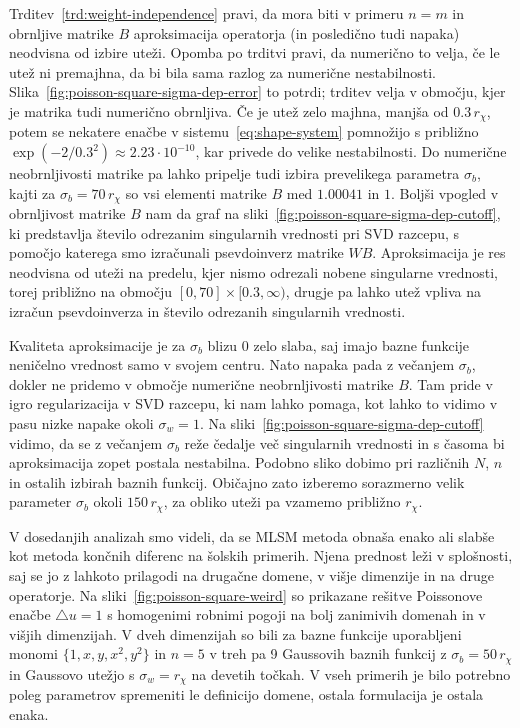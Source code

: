 \documentclass[12pt,a4paper,twoside]{article}
\theoremstyle{definition} %
\theoremstyle{plain} %
\numberwithin{equation}{section}
\newcommand{\lap}{\triangle}
\begin{document}
Trditev~\ref{trd:weight-independence} pravi, da mora biti v primeru $n=m$ in obrnljive matrike $B$
aproksimacija operatorja (in posledično tudi napaka) neodvisna od izbire uteži. Opomba po trditvi
pravi, da numerično to velja, če le utež ni premajhna, da bi bila sama razlog za numerične
nestabilnosti.  Slika~\ref{fig:poisson-square-sigma-dep-error} to potrdi; trditev velja v območju,
kjer je matrika tudi numerično obrnljiva. Če je utež zelo majhna, manjša od $0.3\,r_\chi$, potem se
nekatere enačbe v sistemu~\eqref{eq:shape-system} pomnožijo s približno $\exp(-2/0.3^2) \approx
2.23\cdot10^{-10}$, kar privede do velike nestabilnosti. Do numerične neobrnljivosti matrike pa
lahko pripelje tudi izbira prevelikega parametra $\sigma_b$, kajti za $\sigma_b = 70\,r_\chi$ so vsi
elementi matrike $B$ med $1.00041$ in $1$. Boljši vpogled v obrnljivost matrike $B$ nam da graf na
sliki~\ref{fig:poisson-square-sigma-dep-cutoff}, ki predstavlja število odrezanim singularnih
vrednosti pri SVD razcepu, s pomočjo katerega smo izračunali psevdoinverz matrike $WB$.
Aproksimacija je res neodvisna od uteži na predelu, kjer nismo odrezali nobene singularne vrednosti,
torej približno na območju $[0, 70] \times [0.3, \infty)$, drugje pa lahko utež vpliva na izračun
psevdoinverza in število odrezanih singularnih vrednosti.

Kvaliteta aproksimacije je za $\sigma_b$ blizu 0 zelo slaba, saj imajo bazne funkcije neničelno
vrednost samo v svojem centru. Nato napaka pada z večanjem $\sigma_b$, dokler ne pridemo v območje
numerične neobrnljivosti matrike $B$.  Tam pride v igro regularizacija v SVD razcepu, ki nam lahko
pomaga, kot lahko to vidimo v pasu nizke napake okoli $\sigma_w = 1$. Na
sliki~\ref{fig:poisson-square-sigma-dep-cutoff} vidimo, da se z večanjem $\sigma_b$ reže čedalje več
singularnih vrednosti in s časoma bi aproksimacija zopet postala nestabilna. Podobno sliko dobimo
pri različnih $N$, $n$ in ostalih izbirah baznih funkcij. Običajno zato izberemo sorazmerno velik
parameter $\sigma_b$ okoli $150\,r_\chi$, za obliko uteži pa vzamemo približno $r_\chi$.

V dosedanjih analizah smo videli, da se MLSM metoda obnaša enako ali slabše kot metoda končnih
diferenc na šolskih primerih. Njena prednost leži v splošnosti, saj se jo z lahkoto prilagodi na
drugačne domene, v višje dimenzije in na druge operatorje. Na sliki~\ref{fig:poisson-square-weird}
so prikazane rešitve Poissonove enačbe $\lap u = 1$ s homogenimi robnimi pogoji na bolj zanimivih
domenah in v višjih dimenzijah. V dveh dimenzijah so bili za bazne funkcije uporabljeni monomi $\{1,
x, y, x^2, y^2\}$ in $n=5$ v treh pa 9 Gaussovih baznih funkcij z $\sigma_b = 50\,r_\chi$ in
Gaussovo utežjo s $\sigma_w = r_\chi$ na devetih točkah. V vseh primerih je bilo potrebno poleg
parametrov spremeniti le definicijo domene, ostala formulacija je ostala enaka.
\end{document}
